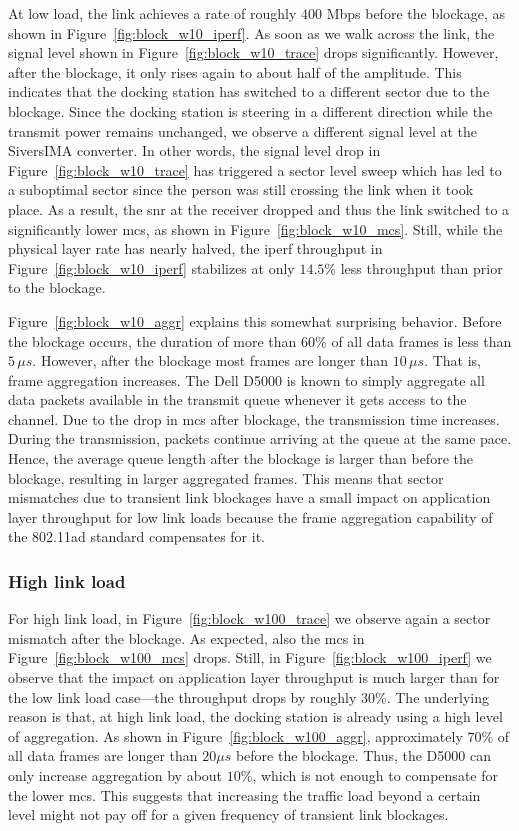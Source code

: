 \documentclass{article}
\begin{document}
At low load, the link achieves a rate of roughly $400$ Mbps before the blockage, as shown in Figure~\ref{fig:block_w10_iperf}. As soon as we walk across the link, the signal level shown in Figure~\ref{fig:block_w10_trace} drops significantly. However, after the blockage, it only rises again to about half of the amplitude. This indicates that the docking station has switched to a different sector due to the blockage. Since the docking station is steering in a different direction while the transmit power remains unchanged, we observe a different signal level at the SiversIMA converter. In other words, the signal level drop in Figure~\ref{fig:block_w10_trace} has triggered a sector level sweep which has led to a suboptimal sector since the person was still crossing the link when it took place. As a result, the \ac{snr} at the receiver dropped and thus the link switched to a significantly lower \ac{mcs}, as shown in Figure~\ref{fig:block_w10_mcs}. Still, while the physical layer rate has nearly halved, the iperf throughput in Figure~\ref{fig:block_w10_iperf} stabilizes at only $14.5\%$ less throughput than prior to the blockage. 

Figure~\ref{fig:block_w10_aggr} explains this somewhat surprising behavior. Before the blockage occurs, the duration of more than $60\%$ of all data frames is less than $5\,\mu s$. However, after the blockage most frames are longer than $10\,\mu s$. That is, frame aggregation increases. The Dell D5000 is known to simply aggregate all data packets available in the transmit queue whenever it gets access to the channel. Due to the drop in \ac{mcs} after blockage, the transmission time increases. During the transmission, packets continue arriving at the queue at the same pace. Hence, the average queue length after the blockage is larger than before the blockage, resulting in larger aggregated frames. This means that sector mismatches due to transient link blockages have a small impact on application layer throughput for low link loads because the frame aggregation capability of the 802.11ad standard compensates for it.

\subsubsection{High link load}
\label{subsubsec:obs_high_load}

For high link load, in Figure~\ref{fig:block_w100_trace} we observe again a sector mismatch after the blockage. As expected, also the \ac{mcs} in Figure~\ref{fig:block_w100_mcs} drops. Still, in Figure~\ref{fig:block_w100_iperf} we observe that the impact on application layer throughput is much larger than for the low link load case---the throughput drops by roughly 30\%. The underlying reason is that, at high link load, the docking station is already using a high level of aggregation. As shown in Figure~\ref{fig:block_w100_aggr}, approximately $70\%$ of all data frames are longer than $20\mu s$ before the blockage. Thus, the D5000 can only increase aggregation by about $10\%$, which is not enough to compensate for the lower \ac{mcs}. This suggests that increasing the traffic load beyond a certain level might not pay off for a given frequency of transient link blockages.
\end{document}
